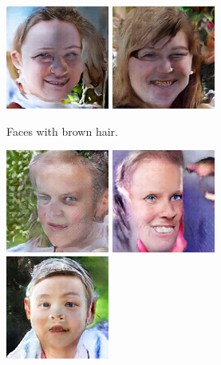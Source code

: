 \begin{figure}[!h]
\begin{subfigure}[b]{\textwidth}
{            \includegraphics[scale=0.485]{figures/ffhq/labeled-hair-brown/ffhq128x128_image015.png}
            \includegraphics[scale=0.485]{figures/ffhq/labeled-hair-brown/ffhq128x128_image016.png}
        }
        \caption{Faces with brown hair.}
        \vspace{0.1cm}
    \end{subfigure}
    \begin{subfigure}[b]{\textwidth}
        \centerline{
            \includegraphics[scale=0.485]{figures/ffhq/labeled-hair-gray/ffhq128x128_image002.png}
            \includegraphics[scale=0.485]{figures/ffhq/labeled-hair-gray/ffhq128x128_image006.png}
            \includegraphics[scale=0.485]{figures/ffhq/labeled-hair-gray/ffhq128x128_image021.png}
}
\end{subfigure}
\end{figure}
